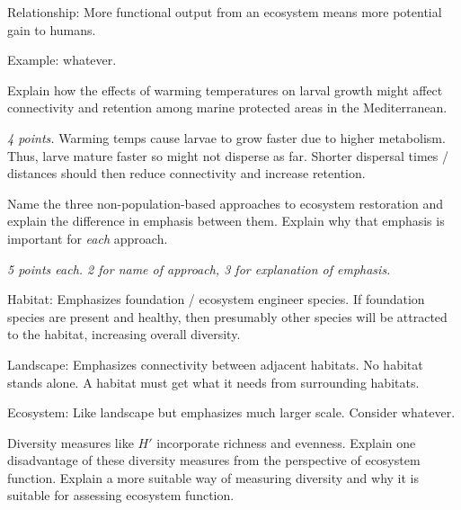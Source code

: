 \documentclass[12pt, addpoints]{exam}
\newcommand*\AnswerBox[2]{%
    \parbox[t][#1]{0.92\textwidth}{%
    \begin{solution}#2\end{solution}}
    \vspace{\stretch{1}}
}
\newenvironment{AnswerPage}[1]
    {\begin{minipage}[t][#1]{0.92\textwidth}%
    \begin{solution}}
    {\end{solution}\end{minipage}
    \vspace{\stretch{1}}}
\begin{document}
\begin{questions}
\begin{AnswerPage}{0.4\textheight}
	Relationship: More functional output from an ecosystem means more potential gain to humans.
	
		\vspace*{\baselineskip}
		
		Example: whatever.
			
	\end{AnswerPage}

\newpage

\question[5]
Explain how the effects of warming temperatures on larval growth might affect connectivity and retention among marine protected areas in the Mediterranean.

	\AnswerBox{0.15\textheight}{%
	\emph{4 points.} Warming temps cause larvae to grow faster due to higher metabolism. Thus, larve mature faster so might not disperse as far. Shorter dispersal times / distances should then reduce connectivity and increase retention.
}

\question[15]
Name the three non-population-based approaches to ecosystem restoration and explain the difference in emphasis between them. Explain why that emphasis is important for \emph{each} approach.


	\begin{AnswerPage}{0.6\textheight}%
	
	\emph{5 points each. 2 for name of approach, 3 for explanation of emphasis.}
	
	\vspace*{\baselineskip}

	Habitat: Emphasizes foundation / ecosystem engineer species. If foundation species are present and healthy, then presumably other species will be attracted to the habitat, increasing overall diversity.
	
	\vspace*{\baselineskip}

	 Landscape: Emphasizes connectivity between adjacent habitats. No habitat stands alone. A habitat must get what it needs from surrounding habitats.
	
	\vspace*{\baselineskip}

	Ecosystem: Like landscape but emphasizes much larger scale. Consider whatever.
	
	\end{AnswerPage}
	
\newpage

\question[10]
Diversity measures like $H'$ incorporate richness and evenness. Explain one disadvantage of these diversity measures from the perspective of ecosystem function. Explain a more suitable way of measuring diversity and why it is suitable for assessing ecosystem function.


\end{questions}
\end{document}
